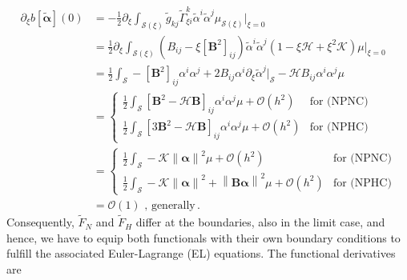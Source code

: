 \documentclass[a4paper,10pt]{scrartcl}
\newcommand{\surf}{\mathcal{S}}
\newcommand{\landau}{\mathcal{O}}
\newcommand{\tg}{\tilde{g}}
\newcommand{\Bb}{\mathbf{B}}
\newcommand{\alphab}{\bm{\alpha}}
\newcommand{\talphab}{\tilde{\alphab}}
\newcommand{\talpha}{\tilde{\alpha}}
\newcommand{\tF}{\tilde{F}}
\newcommand{\tch}[2]{\widetilde{\Gamma}_{#1}^{#2}}
\newcommand{\meanc}{\mathcal{H}}
\newcommand{\gaussc}{\mathcal{K}}
\newcommand{\formPeriod}{\,\text{.}}
\begin{document}
    \begin{align}
      \partial_{\xi}  b\left[ \talphab \right]\left( 0 \right) 
            &=  -\frac{1}{2}\partial_{\xi}  \int_{\surf(\xi)} \tg_{kj}\tch{\xi i}{k} \talpha^{i}\talpha^{j} \mu_{\surf(\xi)}\Big|_{\xi=0} \\
            &= \frac{1}{2}\partial_{\xi} \int_{\surf(\xi)}\left( B_{ij} - \xi\left[ \Bb^{2} \right]_{ij} \right) \talpha^{i}\talpha^{j} \left( 1 - \xi\meanc + \xi^{2}\gaussc\right)\mu\Big|_{\xi=0}\\
            &=  \frac{1}{2} \int_{\surf} -\left[ \Bb^{2} \right]_{ij}\alpha^{i}\alpha^{j} 
                                         +2B_{ij}\alpha^{i}\partial_{\xi}\talpha^{j}\big|_{\surf}
                                         -\meanc B_{ij}\alpha^{i}\alpha^{j} \mu \\
            &=              
              \begin{cases}
                 \frac{1}{2} \int_{\surf} \left[ \Bb^{2} - \meanc\Bb \right]_{ij}\alpha^{i}\alpha^{j} \mu + \landau(h^{2}) & \text{for (NPNC)} \\
                  \frac{1}{2} \int_{\surf} \left[ 3\Bb^{2} - \meanc\Bb \right]_{ij}\alpha^{i}\alpha^{j} \mu + \landau(h^{2}) & \text{for (NPHC)}
              \end{cases}\\
             &=
              \begin{cases}
                \frac{1}{2} \int_{\surf} -\gaussc\left\| \alphab \right\|^{2} \mu + \landau(h^{2}) & \text{for (NPNC)} \\
                \frac{1}{2} \int_{\surf} -\gaussc\left\| \alphab \right\|^{2} + \left\| \Bb\alphab \right\|^{2}\mu + \landau(h^{2}) & \text{for (NPHC)}
              \end{cases} \\
             &= \landau(1) \text{ , generally}
            \formPeriod
    \end{align}
    Consequently, \( \tF_{N} \) and \( \tF_{H} \) differ at the boundaries, also in the limit case, and hence, 
    we have to equip both functionals with their own boundary conditions to fulfill the associated Euler-Lagrange (EL) equations.
    The functional derivatives are
\end{document}
